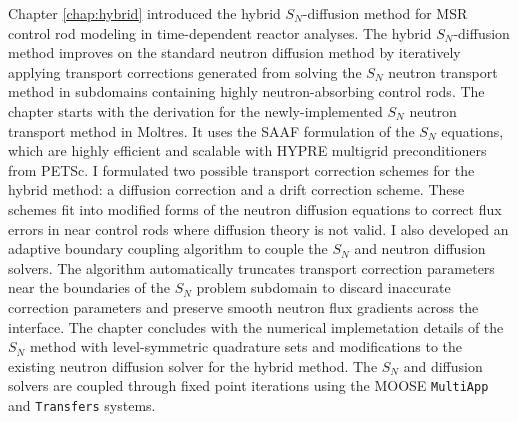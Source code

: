 Chapter \ref{chap:hybrid} introduced the hybrid $S_N$-diffusion method for \gls{MSR} control rod
modeling in time-dependent reactor analyses. The hybrid $S_N$-diffusion method improves on the
standard neutron diffusion method by iteratively applying transport corrections generated from
solving the $S_N$ neutron transport method in subdomains containing highly neutron-absorbing
control rods.
The chapter starts with the derivation for the newly-implemented $S_N$ neutron transport method in
Moltres. It uses the \gls{SAAF} formulation of the $S_N$ equations, which are highly efficient and
scalable with HYPRE multigrid preconditioners \cite{hypre_hypre_2022} from PETSc. I formulated
two possible transport correction schemes for the hybrid method: a diffusion correction and a
drift correction scheme. These schemes fit into modified forms of the neutron diffusion equations
to correct flux errors in near control rods where diffusion theory is not valid. I also developed
an adaptive boundary coupling algorithm to couple the $S_N$ and neutron diffusion solvers. The
algorithm automatically truncates transport correction parameters near the boundaries of the
$S_N$ problem subdomain to discard inaccurate correction parameters and preserve smooth neutron
flux gradients across the interface. The chapter concludes with the numerical implemetation details
of the $S_N$ method with level-symmetric quadrature sets and modifications to the existing neutron
diffusion solver for the hybrid method. The $S_N$ and diffusion solvers are coupled through fixed
point iterations using the \gls{MOOSE} \texttt{MultiApp} and \texttt{Transfers} systems.

